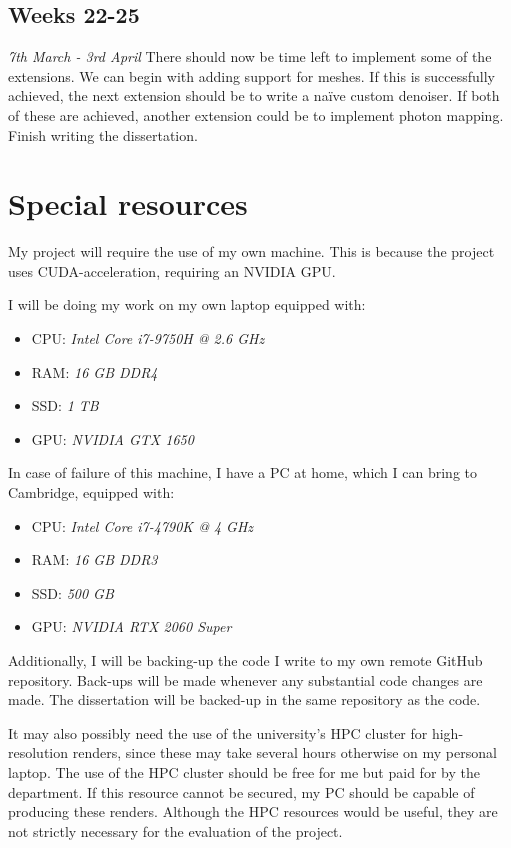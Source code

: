 \documentclass[12pt, a4paper]{article}
\newcommand{\newtime}[3]{
    \subsection*{#1}
    \vspace{-\baselineskip}
    \emph{#2}
    \vspace{\baselineskip}
    \newline
    #3
}
\begin{document}
    \newtime{Weeks 22-25}{7th March - 3rd April}{There should now be time left to implement some of the extensions. We can begin with adding support for meshes. If this is successfully achieved, the next extension should be to write a naïve custom denoiser. If both of these are achieved, another extension could be to implement photon mapping. Finish writing the dissertation.}

    \section*{Special resources}
    My project will require the use of my own machine. This is because the project uses CUDA-acceleration, requiring an NVIDIA GPU.

    I will be doing my work on my own laptop equipped with:
    \begin{itemize}
        \setlength\itemsep{0.1em}
        \item CPU: \emph{Intel Core i7-9750H @ 2.6 GHz}
        \item RAM: \emph{16 GB DDR4}
        \item SSD: \emph{1 TB}
        \item GPU: \emph{NVIDIA GTX 1650}
    \end{itemize}
    
    In case of failure of this machine, I have a PC at home, which I can bring to Cambridge, equipped with:
    \begin{itemize}
        \setlength\itemsep{0.1em}
        \item CPU: \emph{Intel Core i7-4790K @ 4 GHz}
        \item RAM: \emph{16 GB DDR3}
        \item SSD: \emph{500 GB}
        \item GPU: \emph{NVIDIA RTX 2060 Super}
    \end{itemize}

    Additionally, I will be backing-up the code I write to my own remote GitHub repository. Back-ups will be made whenever any substantial code changes are made. The dissertation will be backed-up in the same repository as the code.

    It may also possibly need the use of the university’s HPC cluster for high-resolution renders, since these may take several hours otherwise on my personal laptop. The use of the HPC cluster should be free for me but paid for by the department. If this resource cannot be secured, my PC should be capable of producing these renders. Although the HPC resources would be useful, they are not strictly necessary for the evaluation of the project.
\end{document}
